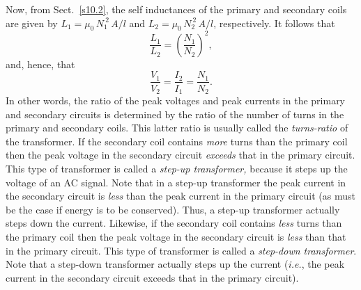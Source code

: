Now, from Sect.~\ref{s10.2}, the self inductances of the primary and
secondary  coils  are given by $L_1=\mu_0\,N_1^{~2} \,A/l$
and $L_2= \mu_0\,N_2^{~2} \,A/l$, respectively. It follows
that
\begin{equation}
\frac{L_1}{L_2} = \left(\frac{N_1}{N_2}\right)^2,
\end{equation}
and, hence, that 
\begin{equation}\label{e10.76}
\frac{V_1}{V_2} = \frac{I_2}{I_1} = \frac{N_1}{N_2}.
\end{equation}
In other words, the ratio of the peak voltages and peak currents
in the primary and secondary circuits is determined by the ratio of
the number of turns in the primary and secondary coils. This latter ratio
is usually called the {\em turns-ratio} of the transformer. If
the secondary coil contains {\em more}\/ turns than the primary coil then the
peak voltage in the secondary circuit {\em  exceeds}\/ that in the primary circuit.
This type of transformer is called a {\em step-up transformer,} because
it steps up the voltage of an AC signal. Note that in a step-up
transformer the peak current in the secondary
circuit is {\em less}\/ than the peak current in the primary circuit  (as must be the case if energy is to be conserved). Thus,
a step-up transformer actually steps down the current. Likewise,
if the secondary coil contains {\em less}\/ turns than the primary coil
then the peak voltage in the secondary circuit is {\em  less}\/ than that
in the primary circuit. This type of transformer is called a {\em step-down
transformer}. Note that a step-down transformer actually steps up the
current ({\em i.e.}, the peak current in the secondary circuit
exceeds that in the primary circuit).

